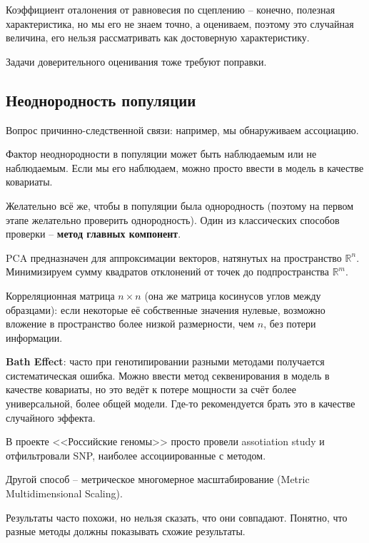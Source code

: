 \documentclass[main.tex]{subfiles}
\begin{document}
Коэффициент оталонения от равновесия по сцеплению -- конечно, полезная характеристика, но мы его не знаем точно, а оцениваем, поэтому это случайная величина, его нельзя рассматривать как достоверную характеристику.

Задачи доверительного оценивания тоже требуют поправки.

\subsection{ Неоднородность популяции }

Вопрос причинно-следственной связи: например, мы обнаруживаем ассоциацию.

Фактор неоднородности в популяции может быть наблюдаемым или не наблюдаемым.
Если мы его наблюдаем, можно просто ввести в модель в качестве ковариаты.

Желательно всё же, чтобы в популяции была однородность (поэтому на первом этапе желательно проверить однородность).
Один из классических способов проверки -- \textbf{метод главных компонент}.

PCA предназначен для аппроксимации векторов, натянутых на пространство $ \mathds R^n $.
Минимизируем сумму квадратов отклонений от точек до подпространства $ \mathds R^m $.

Корреляционная матрица $ n \times n $ (она же матрица косинусов углов между образцами): если некоторые её собственные значения нулевые, возможно вложение в пространство более низкой размерности, чем $ n $, без потери информации.

\textbf{Bath Effect}: часто при генотипировании разными методами получается систематическая ошибка.
Можно ввести метод секвенирования в модель в качестве ковариаты, но это ведёт к потере мощности за счёт более универсальной, более общей модели.
Где-то рекомендуется брать это в качестве случайного эффекта.

\begin{leftbar}
	В проекте <<Российские геномы>> просто провели assotiation study и отфильтровали SNP, наиболее ассоциированные с методом.
\end{leftbar}

Другой способ -- метрическое многомерное масштабирование (Metric Multidimensional Scaling).

Результаты часто похожи, но нельзя сказать, что они совпадают.
Понятно, что разные методы должны показывать схожие результаты.
\end{document}
